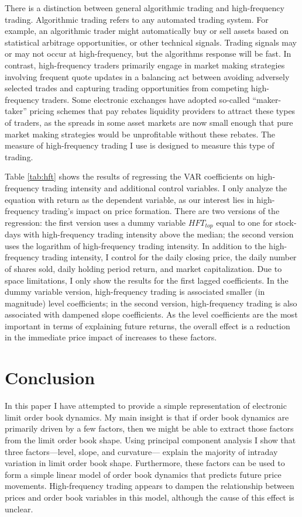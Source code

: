 	There is a distinction between general algorithmic trading and high-frequency trading. Algorithmic trading refers to any automated trading system. For example, an algorithmic trader might automatically buy or sell assets based on statistical arbitrage opportunities, or other technical signals. Trading signals may or may not occur at high-frequency, but the algorithms response will be fast. In contrast, high-frequency traders primarily engage in market making strategies involving frequent quote updates in a balancing act between avoiding adversely selected trades and capturing trading opportunities from competing high-frequency traders. Some electronic exchanges have adopted so-called ``maker-taker'' pricing schemes that pay rebates liquidity providers to attract these types of traders, as the spreads in some asset markets are now small enough that pure market making strategies would be unprofitable without these rebates. The measure of high-frequency trading I use is designed to measure this type of trading.

	Table \ref{tab:hft} shows the results of regressing the VAR coefficients on high-frequency trading intensity and additional control variables. I only analyze the equation with return as the dependent variable, as our interest lies in high-frequency trading's impact on price formation. There are two versions of the regression: the first version uses a dummy variable $HFT_{top}$ equal to one for stock-days with high-frequency trading intensity above the median; the second version uses the logarithm of high-frequency trading intensity. In addition to the high-frequency trading intensity, I control for the daily closing price, the daily number of shares sold, daily holding period return, and market capitalization. Due to space limitations, I only show the results for the first lagged coefficients. In the dummy variable version, high-frequency trading is associated smaller (in magnitude) level coefficients; in the second version, high-frequency trading is also associated with dampened slope coefficients. As the level coefficients are the most important in terms of explaining future returns, the overall effect is a reduction in the immediate price impact of increases to these factors.


\section{Conclusion}
	In this paper I have attempted to provide a simple representation of electronic limit order book dynamics. My main insight is that if order book dynamics are primarily driven by a few factors, then we might be able to extract those factors from the limit order book shape. Using principal component analysis I show that three factors---level, slope, and curvature--- explain the majority of intraday variation in limit order book shape. Furthermore, these factors can be used to form a simple linear model of order book dynamics that predicts future price movements. High-frequency trading appears to dampen the relationship between prices and order book variables in this model, although the cause of this effect is unclear.


